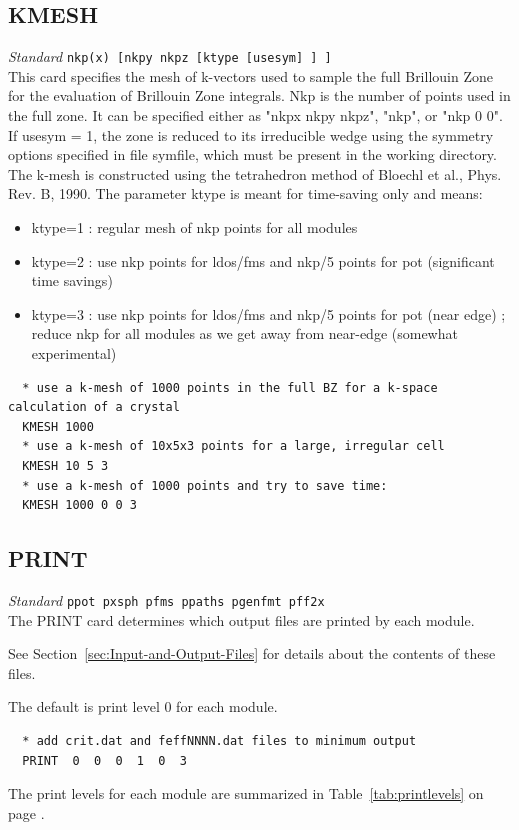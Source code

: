 \documentclass[11pt,oneside]{report} %
\newenvironment{Card}[4]%
      {\vspace{3ex}%
        \subsection{#1}
        \quad\textsl{#3}\newline
        \quad\texttt{#2}\newline%
        \label{card:#4}\\}
      {}
\begin{document}
\begin{Card}{KMESH}{nkp(x) [nkpy nkpz [ktype [usesym] ] ]}{Standard}{kme}
This card specifies the mesh of k-vectors used to sample the full Brillouin Zone for the evaluation of Brillouin Zone integrals.  Nkp is the number of points used in the full zone.  It can be specified either as "nkpx nkpy nkpz", "nkp", or "nkp 0 0".  If usesym = 1, the zone is reduced to its irreducible wedge using the symmetry options specified in file symfile, which must be present in the working directory.   The k-mesh is constructed using the tetrahedron method of Bloechl et al., Phys. Rev. B, 1990.  The parameter ktype is meant for time-saving only and means:
\begin{itemize} \tightlist
\item ktype=1  :  regular mesh of nkp points for all modules
\item ktype=2  :  use nkp points for ldos/fms and nkp/5 points for pot  (significant time savings)
\item ktype=3  :  use nkp points for ldos/fms and nkp/5 points for pot (near edge) ; reduce nkp for all modules as we get away from near-edge (somewhat experimental)
\end{itemize}

\begin{verbatim}
  * use a k-mesh of 1000 points in the full BZ for a k-space calculation of a crystal
  KMESH 1000
  * use a k-mesh of 10x5x3 points for a large, irregular cell
  KMESH 10 5 3
  * use a k-mesh of 1000 points and try to save time:
  KMESH 1000 0 0 3
\end{verbatim}
\end{Card}



\begin{Card}{PRINT}{ppot pxsph pfms ppaths pgenfmt pff2x}{Standard}{pri}
  The PRINT card determines which output files are printed by each
  module. 
\begin{latexonly}
  See Section~\ref{sec:Input-and-Output-Files} for details about 
  the contents of these files.
\end{latexonly}
  The default is print level 0 for each module.
\begin{verbatim}
  * add crit.dat and feffNNNN.dat files to minimum output
  PRINT  0  0  0  1  0  3
\end{verbatim}
\begin{latexonly}
  The print levels for each module are summarized in
  Table~\ref{tab:printlevels} on page \pageref{tab:printlevels}.
\end{latexonly}
\end{Card}
\end{document}
